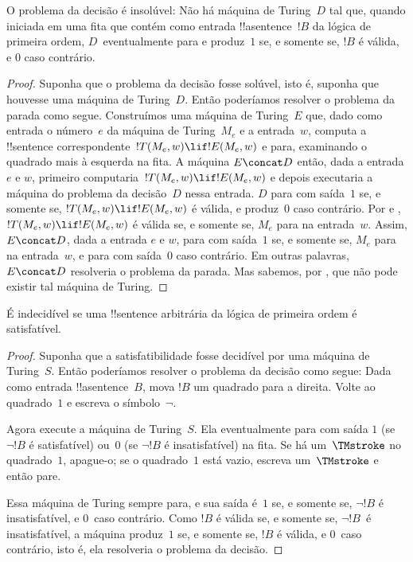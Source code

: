 \documentclass[../../../include/open-logic-section]{subfiles}
\begin{document}

\begin{thm}
O problema da decisão é insolúvel: Não há máquina de Turing~$D$ tal
que, quando iniciada em uma fita que contém como entrada
!!a{sentence}~$!B$ da lógica de primeira ordem, $D$~eventualmente para
e produz~$1$ se, e somente se, $!B$ é válida, e $0$ caso contrário.
\end{thm}

\begin{proof}
Suponha que o problema da decisão fosse solúvel, isto é, suponha que
houvesse uma máquina de Turing~$D$. Então poderíamos resolver o
problema da parada como segue. Construímos uma máquina de Turing~$E$
que, dado como entrada o número~$e$ da máquina de Turing~$M_e$ e a
entrada~$w$, computa a !!{sentence} correspondente~$!T(M_e, w) \lif
!E(M_e, w)$ e para, examinando o quadrado mais à esquerda na fita.  A
máquina $E \concat D$ então, dada a entrada $e$ e $w$, primeiro
computaria~$!T(M_e, w) \lif !E(M_e, w)$ e depois executaria a máquina
do problema da decisão~$D$ nessa entrada.  $D$ para com saída~$1$ se,
e somente se, $!T(M_e, w) \lif !E(M_e, w)$ é válida, e produz~$0$ caso
contrário. Por  e
, $!T(M_e, w) \lif !E(M_e, w)$ é válida
se, e somente se, $M_e$ para na entrada~$w$. Assim, $E\concat D$, dada
a entrada $e$ e $w$, para com saída~$1$ se, e somente se, $M_e$ para na
entrada~$w$, e para com saída~$0$ caso contrário. Em outras palavras,
$E \concat D$ resolveria o problema da parada.  Mas sabemos, por
, que não pode existir tal máquina de
Turing.
\end{proof}

\begin{cor}%
É indecidível se uma !!{sentence} arbitrária da lógica de primeira ordem é satisfatível.
\end{cor}

\begin{proof}
  Suponha que a satisfatibilidade fosse decidível por uma máquina de
  Turing~$S$. Então poderíamos resolver o problema da decisão como
  segue: Dada como entrada !!a{sentence}~$B$, mova $!B$ um quadrado
  para a direita. Volte ao quadrado~$1$ e escreva o símbolo~$\lnot$.

  Agora execute a máquina de Turing~$S$. Ela eventualmente para com
  saída $1$ (se $\lnot !B$ é satisfatível) ou~$0$ (se $\lnot !B$ é
  insatisfatível) na fita. Se há um~$\TMstroke$ no quadrado~$1$,
  apague-o; se o quadrado~$1$ está vazio, escreva um~$\TMstroke$ e
  então pare.

  Essa máquina de Turing sempre para, e sua saída é~$1$ se, e somente
  se, $\lnot !B$ é insatisfatível, e $0$~caso contrário. Como $!B$ é
  válida se, e somente se, $\lnot !B$~é insatisfatível, a máquina
  produz~$1$ se, e somente se, $!B$ é válida, e $0$~caso contrário,
  isto é, ela resolveria o problema da decisão.
\end{proof}
\end{document}
